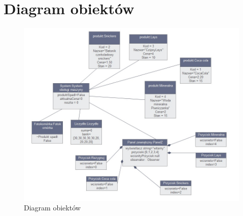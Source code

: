 \documentclass[a4paper, 11pt]{article}
\begin{document}
\section{Diagram obiektów}
\begin{figure}[H]
\includegraphics[scale=0.6]{../Diagrams/diagramObiektow2}
\caption{Diagram obiektów}
\end{figure}


%
%
\end{document}
